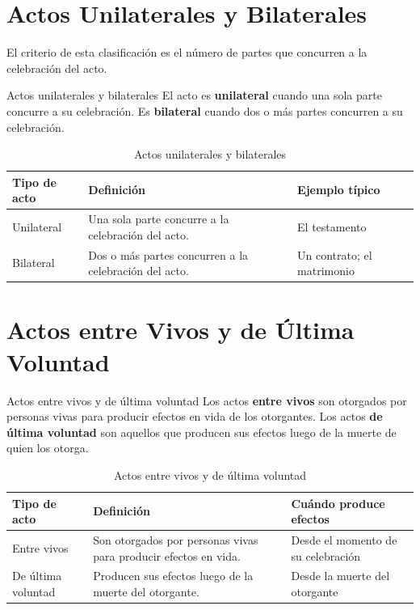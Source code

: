 \documentclass[12pt,oneside]{book}
\begin{document}
\section{Actos Unilaterales y Bilaterales}

El criterio de esta clasificación es el número de partes que concurren a la celebración del acto.

\begin{definition}{Actos unilaterales y bilaterales}
El acto es \textbf{unilateral} cuando una sola parte concurre a su celebración. Es \textbf{bilateral} cuando dos o más partes concurren a su celebración.
\end{definition}

\begin{table}[H]
\centering
\begin{tabularx}{\textwidth}{l X l}
\toprule
\textbf{Tipo de acto} & \textbf{Definición} & \textbf{Ejemplo típico} \\
\midrule
Unilateral & Una sola parte concurre a la celebración del acto. & El testamento \\
Bilateral & Dos o más partes concurren a la celebración del acto. & Un contrato; el matrimonio \\
\bottomrule
\end{tabularx}
\caption{Actos unilaterales y bilaterales}
\end{table}

\section{Actos entre Vivos y de Última Voluntad}

\begin{definition}{Actos entre vivos y de última voluntad}
Los actos \textbf{entre vivos} son otorgados por personas vivas para producir efectos en vida de los otorgantes. Los actos \textbf{de última voluntad} son aquellos que producen sus efectos luego de la muerte de quien los otorga.
\end{definition}

\begin{table}[H]
\centering
\begin{tabularx}{\textwidth}{l X X}
\toprule
\textbf{Tipo de acto} & \textbf{Definición} & \textbf{Cuándo produce efectos} \\
\midrule
Entre vivos & Son otorgados por personas vivas para producir efectos en vida. & Desde el momento de su celebración \\
De última voluntad & Producen sus efectos luego de la muerte del otorgante. & Desde la muerte del otorgante \\
\bottomrule
\end{tabularx}
\caption{Actos entre vivos y de última voluntad}
\end{table}
\end{document}

